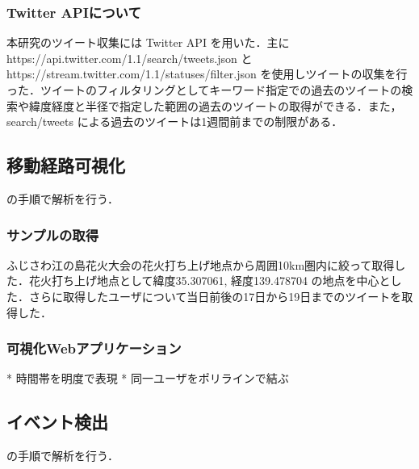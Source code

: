 \subsubsection{Twitter APIについて}
本研究のツイート収集には Twitter API を用いた．主に https://api.twitter.com/1.1/search/tweets.json と https://stream.twitter.com/1.1/statuses/filter.json を使用しツイートの収集を行った．ツイートのフィルタリングとしてキーワード指定での過去のツイートの検索や緯度経度と半径で指定した範囲の過去のツイートの取得ができる．また，search/tweets による過去のツイートは1週間前までの制限がある．

\subsection{移動経路可視化}
の手順で解析を行う．

\subsubsection{サンプルの取得}
ふじさわ江の島花火大会の花火打ち上げ地点から周囲10km圏内に絞って取得した．花火打ち上げ地点として緯度35.307061, 経度139.478704 の地点を中心とした．さらに取得したユーザについて当日前後の17日から19日までのツイートを取得した．


\subsubsection{可視化Webアプリケーション}
* 時間帯を明度で表現
* 同一ユーザをポリラインで結ぶ

\subsection{イベント検出}
の手順で解析を行う．

